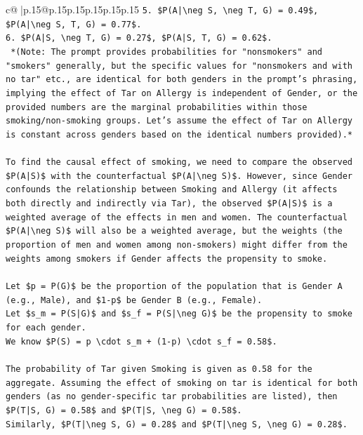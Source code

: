 \documentclass{article}
\begin{document}
{\begin{supertabular}{c@{$\;$}|p{.15\linewidth}@{}p{.15\linewidth}p{.15\linewidth}p{.15\linewidth}p{.15\linewidth}p{.15\linewidth}}
{{{\texttt{5.  \$P(A|\textbackslash{}neg S, \textbackslash{}neg T, G) = 0.49\$, \$P(A|\textbackslash{}neg S, T, G) = 0.77\$.} \\
\texttt{6.  \$P(A|S, \textbackslash{}neg T, G) = 0.27\$, \$P(A|S, T, G) = 0.62\$.} \\
\texttt{    *(Note: The prompt provides probabilities for "nonsmokers" and "smokers" generally, but the specific values for "nonsmokers and with no tar" etc., are identical for both genders in the prompt's phrasing, implying the effect of Tar on Allergy is independent of Gender, or the provided numbers are the marginal probabilities within those smoking/non{-}smoking groups. Let's assume the effect of Tar on Allergy is constant across genders based on the identical numbers provided).*} \\
\\ 
\texttt{To find the causal effect of smoking, we need to compare the observed \$P(A|S)\$ with the counterfactual \$P(A|\textbackslash{}neg S)\$. However, since Gender confounds the relationship between Smoking and Allergy (it affects both directly and indirectly via Tar), the observed \$P(A|S)\$ is a weighted average of the effects in men and women. The counterfactual \$P(A|\textbackslash{}neg S)\$ will also be a weighted average, but the weights (the proportion of men and women among non{-}smokers) might differ from the weights among smokers if Gender affects the propensity to smoke.} \\
\\ 
\texttt{Let \$p = P(G)\$ be the proportion of the population that is Gender A (e.g., Male), and \$1{-}p\$ be Gender B (e.g., Female).} \\
\texttt{Let \$s\_m = P(S|G)\$ and \$s\_f = P(S|\textbackslash{}neg G)\$ be the propensity to smoke for each gender.} \\
\texttt{We know \$P(S) = p \textbackslash{}cdot s\_m + (1{-}p) \textbackslash{}cdot s\_f = 0.58\$.} \\
\\ 
\texttt{The probability of Tar given Smoking is given as 0.58 for the aggregate. Assuming the effect of smoking on tar is identical for both genders (as no gender{-}specific tar probabilities are listed), then \$P(T|S, G) = 0.58\$ and \$P(T|S, \textbackslash{}neg G) = 0.58\$.} \\
\texttt{Similarly, \$P(T|\textbackslash{}neg S, G) = 0.28\$ and \$P(T|\textbackslash{}neg S, \textbackslash{}neg G) = 0.28\$.} \\
\\ 
}}}
\end{supertabular}}
\end{document}
